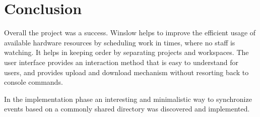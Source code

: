\chapter{Conclusion}

Overall the project was a success.
Winslow helps to improve the efficient usage of available hardware resources by scheduling work in times, where no staff is watching.
It helps in keeping order by separating projects and workspaces.
The user interface provides an interaction method that is easy to understand for users, and provides upload and download mechanism without resorting back to console commands.

In the implementation phase an interesting and minimalistic way to synchronize events based on a commonly shared directory was discovered and implemented.

